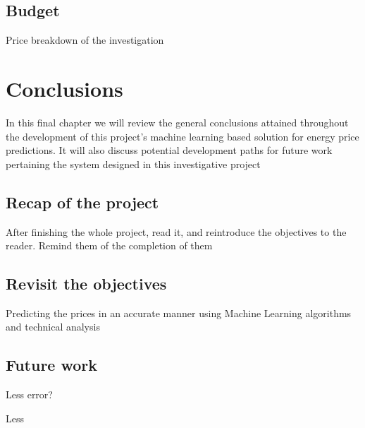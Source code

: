 \documentclass[12pt]{report} %
\begin{document}
\section{Budget}
Price breakdown of the investigation



\chapter{Conclusions}
In this final chapter we will review the general conclusions attained throughout the development of this project's machine learning based solution for energy price predictions. It will also discuss potential development paths for future work pertaining the system designed in this investigative project

\section{Recap of the project}
After finishing the whole project, read it, and reintroduce the objectives to the reader. Remind them of the completion of them

\section{Revisit the objectives}
Predicting the prices in an accurate manner using Machine Learning algorithms and technical analysis

\section{Future work}
    Less error?

    Less 



\clearpage
{}

\printbibliography




\end{document}
